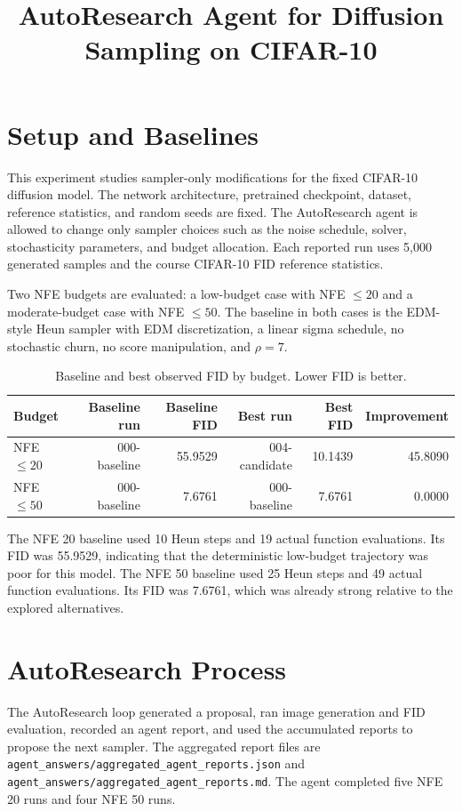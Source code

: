 \documentclass[11pt]{article}
\title{AutoResearch Agent for Diffusion Sampling on CIFAR-10}
\author{}
\date{}
\begin{document}
\maketitle

\section{Setup and Baselines}

This experiment studies sampler-only modifications for the fixed CIFAR-10 diffusion model. The network architecture, pretrained checkpoint, dataset, reference statistics, and random seeds are fixed. The AutoResearch agent is allowed to change only sampler choices such as the noise schedule, solver, stochasticity parameters, and budget allocation. Each reported run uses 5,000 generated samples and the course CIFAR-10 FID reference statistics.

Two NFE budgets are evaluated: a low-budget case with NFE $\leq 20$ and a moderate-budget case with NFE $\leq 50$. The baseline in both cases is the EDM-style Heun sampler with EDM discretization, a linear sigma schedule, no stochastic churn, no score manipulation, and $\rho=7$.

\begin{table}[h]
\centering
\caption{Baseline and best observed FID by budget. Lower FID is better.}
\begin{tabular}{lrrrrr}
\toprule
Budget & Baseline run & Baseline FID & Best run & Best FID & Improvement \\
\midrule
NFE $\leq 20$ & 000-baseline & 55.9529 & 004-candidate & 10.1439 & 45.8090 \\
NFE $\leq 50$ & 000-baseline & 7.6761 & 000-baseline & 7.6761 & 0.0000 \\
\bottomrule
\end{tabular}
\end{table}

The NFE 20 baseline used 10 Heun steps and 19 actual function evaluations. Its FID was 55.9529, indicating that the deterministic low-budget trajectory was poor for this model. The NFE 50 baseline used 25 Heun steps and 49 actual function evaluations. Its FID was 7.6761, which was already strong relative to the explored alternatives.

\section{AutoResearch Process}

The AutoResearch loop generated a proposal, ran image generation and FID evaluation, recorded an agent report, and used the accumulated reports to propose the next sampler. The aggregated report files are \texttt{agent\_answers/aggregated\_agent\_reports.json} and \texttt{agent\_answers/aggregated\_agent\_reports.md}. The agent completed five NFE 20 runs and four NFE 50 runs.
\end{document}
